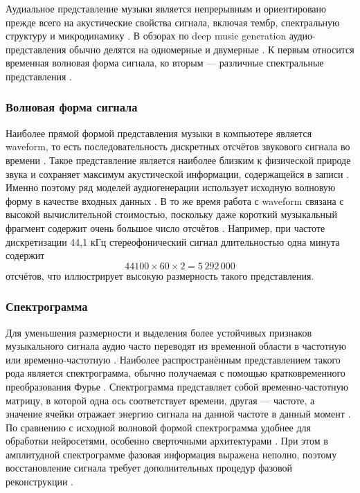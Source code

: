 \documentclass[a4paper,12pt]{extarticle}
\begin{document}
Аудиальное представление музыки является непрерывным и ориентировано прежде всего на акустические свойства сигнала, включая тембр, спектральную структуру и микродинамику \cite{ji2020comprehensive,duan2025recent}. 
В обзорах по deep music generation аудио-представления обычно делятся на одномерные и двумерные \cite{ji2020comprehensive}. 
К первым относится временная волновая форма сигнала, ко вторым --- различные спектральные представления \cite{briot2017deep,ji2020comprehensive}. 

\subsubsection{Волновая форма сигнала}
\label{subsubsec:waveform}

Наиболее прямой формой представления музыки в компьютере является waveform, то есть последовательность дискретных отсчётов звукового сигнала во времени \cite{briot2017deep,ji2020comprehensive,duan2025recent}. 
Такое представление является наиболее близким к физической природе звука и сохраняет максимум акустической информации, содержащейся в записи \cite{ji2020comprehensive,duan2025recent}. 
Именно поэтому ряд моделей аудиогенерации использует исходную волновую форму в качестве входных данных \cite{ji2020comprehensive}. 
В то же время работа с waveform связана с высокой вычислительной стоимостью, поскольку даже короткий музыкальный фрагмент содержит очень большое число отсчётов \cite{briot2017deep,ji2020comprehensive}. 
Например, при частоте дискретизации 44{,}1 кГц стереофонический сигнал длительностью одна минута содержит
\[
44100 \times 60 \times 2 = 5\,292\,000
\]
отсчётов, что иллюстрирует высокую размерность такого представления. 

\subsubsection{Спектрограмма}
\label{subsubsec:spectrogram}

Для уменьшения размерности и выделения более устойчивых признаков музыкального сигнала аудио часто переводят из временной области в частотную или временно-частотную \cite{briot2017deep,ji2020comprehensive,duan2025recent}. 
Наиболее распространённым представлением такого рода является спектрограмма, обычно получаемая с помощью кратковременного преобразования Фурье \cite{briot2017deep,ji2020comprehensive,duan2025recent}. 
Спектрограмма представляет собой временно-частотную матрицу, в которой одна ось соответствует времени, другая --- частоте, а значение ячейки отражает энергию сигнала на данной частоте в данный момент \cite{duan2025recent,ji2020comprehensive}. 
По сравнению с исходной волновой формой спектрограмма удобнее для обработки нейросетями, особенно сверточными архитектурами \cite{ji2020comprehensive}. 
При этом в амплитудной спектрограмме фазовая информация выражена неполно, поэтому восстановление сигнала требует дополнительных процедур фазовой реконструкции \cite{ji2020comprehensive}. 
\end{document}

